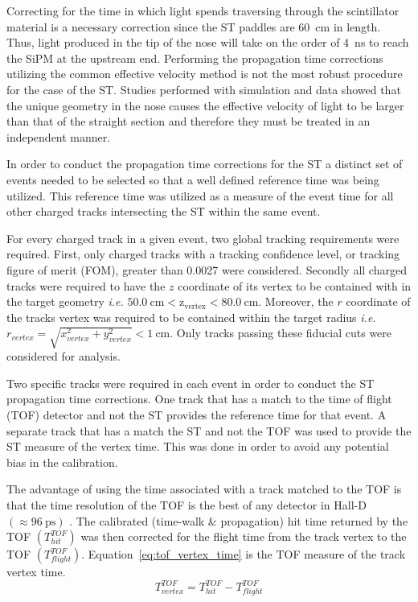 Correcting for the time in which light spends traversing through the scintillator material is a necessary correction since the ST paddles are 60~cm in length.  Thus, light produced in the tip of the nose will take on the order of 4~ns to reach the SiPM at the upstream end.  Performing the propagation time corrections utilizing the common effective velocity method is not the most robust procedure for the case of the ST.  Studies performed with simulation and data showed that the unique geometry in the nose causes the effective velocity of light to be larger than that of the straight section and therefore they must be treated in an independent manner.

In order to conduct the propagation time corrections for the ST a distinct set of events needed to be selected so that a well defined reference time was being utilized.  This reference time was utilized as a measure of the event time for all other charged tracks intersecting the ST within the same event.  

For every charged track in a given event, two global tracking requirements were required.  First, only charged tracks with a tracking confidence level, or tracking figure of merit (FOM), greater than 0.0027 were considered.  Secondly all charged tracks were required to have the $z$ coordinate of its vertex to be contained with in the target geometry \textit{i.e.} $\mathrm{50.0\ cm < z_{vertex} < 80.0\ cm}$.  Moreover, the $r$ coordinate of the tracks vertex was required to be contained within the target radius \textit{i.e.} $r_{vertex} = \sqrt{x^{2}_{vertex} + y^{2}_{vertex}} < 1\ \mathrm{cm}$.  Only tracks passing these fiducial cuts were considered for analysis.

Two specific tracks were required in each event in order to conduct the ST propagation time corrections.  One track that has a match to the time of flight (TOF) detector and not the ST provides the reference time for that event.  A separate track that has a match the ST and not the TOF was used to provide the ST measure of the vertex time.  This was done in order to avoid any potential bias in the calibration.  
	
The advantage of using the time associated with a track matched to the TOF is that the time resolution of the TOF is the best of any detector in Hall-D $(\approx 96\ \mathrm{ps})$ \cite{zihlmann_tof}. The calibrated (time-walk \& propagation) hit time returned by the TOF $(T^{TOF}_{hit})$ was then corrected for the flight time from the track vertex to the TOF $(T^{TOF}_{flight})$.  Equation~\ref{eq:tof_vertex_time} is the TOF measure of the track vertex time.
	\begin{equation} \label{eq:tof_vertex_time}
		T^{TOF}_{vertex} = T^{TOF}_{hit} - T^{TOF}_{flight}
	\end{equation}

